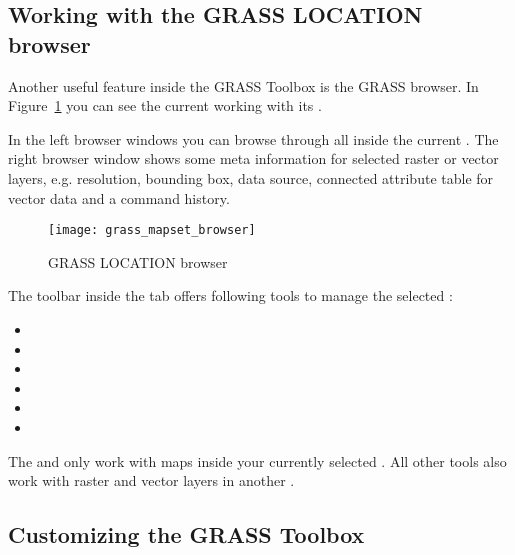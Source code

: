 \subsection{Working with the GRASS LOCATION browser} 

Another useful feature inside the GRASS Toolbox is the GRASS
 browser. In Figure~\ref{fig:grass_mapset_browser} you
can see the current working  with its .

In the left browser windows you can browse through all 
inside the current . The right browser window shows some
meta information for selected raster or vector layers, e.g. resolution,
bounding box, data source, connected attribute table for vector data and a
command history.

\begin{figure}[h]
 \centering
 \texttt{[image: grass\_mapset\_browser]}
 \caption{GRASS LOCATION browser \nixcaption}\label{fig:grass_mapset_browser}
\end{figure}

The toolbar inside the  tab offers following tools to manage
the selected :

\begin{itemize}[label=--]
\item {}
\item {}
\item {}
\item {}
\item {}
\item {}
\end{itemize}

The  and
 only work with maps inside
your currently selected . All other tools also work with
raster and vector layers in another .

\subsection{Customizing the GRASS Toolbox} 
\label{sec:toolbox-customizing}

